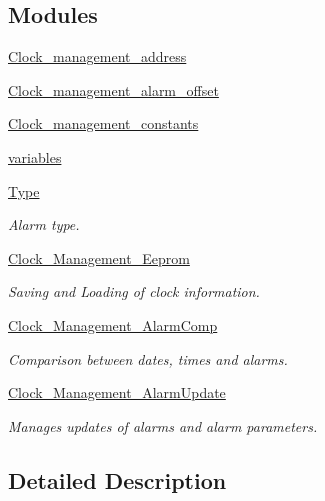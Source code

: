 \subsection*{Modules}
\begin{DoxyCompactItemize}
\item 
\hyperlink{group___clock__management__address}{Clock\+\_\+management\+\_\+address}
\item 
\hyperlink{group___clock__management__alarm__offset}{Clock\+\_\+management\+\_\+alarm\+\_\+offset}
\item 
\hyperlink{group___clock__management__constants}{Clock\+\_\+management\+\_\+constants}
\item 
\hyperlink{group__clock__management}{variables}
\item 
\hyperlink{group__type}{Type}
\begin{DoxyCompactList}\small\item\em Alarm type. \end{DoxyCompactList}\item 
\hyperlink{group___clock___management___eeprom}{Clock\+\_\+\+Management\+\_\+\+Eeprom}
\begin{DoxyCompactList}\small\item\em Saving and Loading of clock information. \end{DoxyCompactList}\item 
\hyperlink{group___clock___management___alarm_comp}{Clock\+\_\+\+Management\+\_\+\+Alarm\+Comp}
\begin{DoxyCompactList}\small\item\em Comparison between dates, times and alarms. \end{DoxyCompactList}\item 
\hyperlink{group___clock___management___alarm_update}{Clock\+\_\+\+Management\+\_\+\+Alarm\+Update}
\begin{DoxyCompactList}\small\item\em Manages updates of alarms and alarm parameters. \end{DoxyCompactList}\end{DoxyCompactItemize}


\subsection{Detailed Description}
